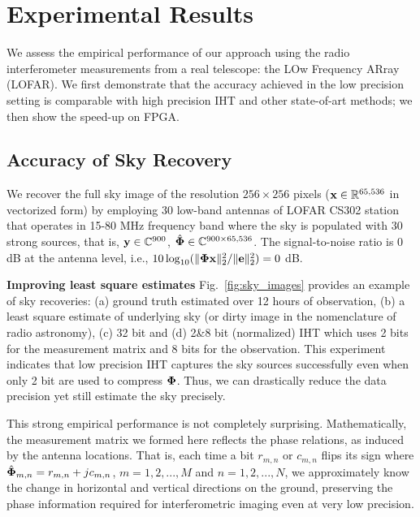 \documentclass[aoas,preprint]{imsart}
\numberwithin{equation}{section}
\theoremstyle{plain}
\begin{document}
{%
\section{Experimental Results}\label{section_experiments}

We assess the empirical performance of our approach using the radio interferometer measurements from a real telescope: the LOw Frequency ARray (LOFAR). We first demonstrate that the accuracy achieved in the low precision setting is comparable with high precision IHT and other state-of-art methods; we then show the speed-up on FPGA.

\subsection{Accuracy of Sky Recovery}
We recover the full sky image of the resolution $256\times 256$ pixels (${\bf x} \in \mathbb{R}^{65,536}$ in vectorized form) by employing 30 low-band antennas of LOFAR CS302 station that operates in 15-80 MHz frequency band where the sky is populated with 30 strong sources, that is, ${\bf y} \in \mathbb{C}^{900}$, $\hat{\bf \Phi} \in \mathbb{C}^{900\times 65,536}$. The signal-to-noise ratio is 0 dB at the antenna level, i.e., $10\log_{10}(\|{\bf \Phi x}\|_2^2/\|{\bf e}\|_2^2) = 0$ dB. 
\vspace{0.5em}

{\bf Improving least square estimates}
Fig.~\ref{fig:sky_images} provides an example of sky recoveries: (a) ground truth estimated over 12 hours of observation, (b) a least square estimate of underlying sky (or dirty image in the nomenclature of radio astronomy), (c) 32 bit and (d) 2\&8 bit (normalized) IHT which uses 2 bits for the measurement matrix and 8 bits for the observation. This experiment indicates that low precision IHT captures the sky sources successfully even when only 2 bit are used to compress ${\bf \Phi}$. Thus, we can drastically reduce the data precision yet still estimate the sky precisely.
\vspace{0.5em}

This strong empirical performance is not completely surprising. Mathematically, the measurement matrix we formed here reflects the phase relations, as induced by the antenna locations.  That is, each time a bit $r_{m, n}$ or $c_{m, n}$ flips its sign where $\hat{\bf \Phi}_{m, n} = r_{m, n} +j c_{m,n}$, $m = {1, 2, ..., M}$ and $n = {1, 2, ..., N}$, we approximately know the change in horizontal and vertical directions on the ground, preserving the phase information required for interferometric imaging even at very low precision.
\vspace{0.5em}

}
\end{document}
